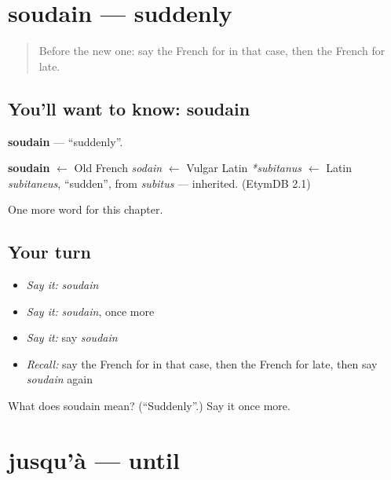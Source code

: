 \section[soudain]{soudain — suddenly}

\label{lesson:FR-C187-soudain}



\begin{quote}
Before the new one: say the French for in that case, then the French for late.
\end{quote}

\subsection*{You'll want to know: soudain}
\textbf{soudain} — \textquotedblleft{}suddenly\textquotedblright{}.

\begin{cousinweb}
\textbf{soudain} $\leftarrow$ Old French \emph{sodain} $\leftarrow$ Vulgar Latin \emph{*subitanus} $\leftarrow$ Latin \emph{subitaneus}, \textquotedblleft{}sudden\textquotedblright{}, from \emph{subitus} — inherited. (EtymDB 2.1)
\end{cousinweb}

\begin{grammarlens}[title={What you've built}]
One more word for this chapter.
\end{grammarlens}

\subsection*{Your turn}
\begin{itemize}
\raggedright
  \item \emph{Say it:} \emph{soudain}
  \item \emph{Say it:} \emph{soudain}, once more
  \item \emph{Say it:} say \emph{soudain}
  \item \emph{Recall:} say the French for in that case, then the French for late, then say \emph{soudain} again
\end{itemize}

\begin{tcolorbox}[breakable,colback=teal!4,colframe=teal!35!black,title={Before you move on}]
What does soudain mean? (\textquotedblleft{}Suddenly\textquotedblright{}.) Say it once more.
\end{tcolorbox}
\section[jusqu'à]{jusqu'à — until}

